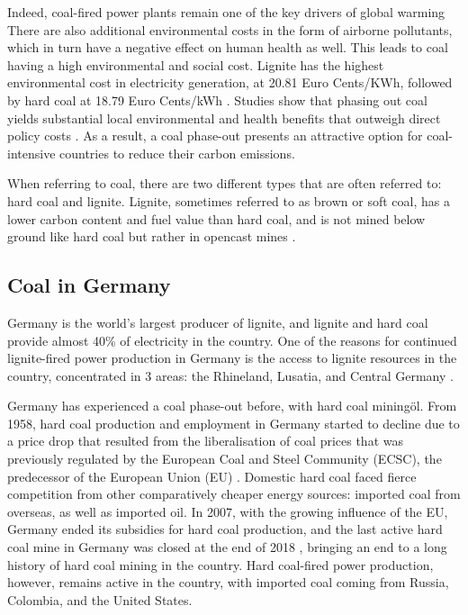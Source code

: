 \documentclass[12pt,onecolumn,twoside]{layout}
\begin{document}
Indeed, coal-fired power plants remain one of the key drivers of global warming \citep{Edwards2019,Zhao2019} There are also  additional environmental costs in the form of airborne pollutants, which in turn have a negative effect on human health as well. This leads to coal having a high environmental and social cost. Lignite has the highest environmental cost in electricity generation, at 20.81 Euro Cents/KWh, followed by hard coal at 18.79 Euro Cents/kWh \citep{Oei2020}. Studies show that phasing out coal yields substantial local environmental and health benefits that outweigh direct policy costs \citep{Rauner2020}. As a result, a coal phase-out presents an attractive option for coal-intensive countries to reduce their carbon emissions.

When referring to coal, there are two different types that are often referred to: hard coal and lignite. Lignite, sometimes referred to as brown or soft coal, has a lower carbon content and fuel value than hard coal, and is not mined below ground like hard coal but rather in opencast mines \citep{Appunn2019}.

\subsection*{Coal in Germany}
Germany is the world's largest producer of lignite, and lignite and hard coal provide almost 40\% of electricity in the country. One of the reasons for continued lignite-fired power production in Germany is the access to lignite resources in the country, concentrated in 3 areas: the Rhineland, Lusatia, and Central Germany \citep{AgoraEnergiewende2019}.

Germany has experienced a coal phase-out before, with hard coal miningöl. From 1958, hard coal production and employment in Germany started to decline due to a price drop that resulted from the liberalisation of coal prices that was previously regulated by the European Coal and Steel Community (ECSC), the predecessor of the European Union (EU) \citep{Oei2019}. Domestic hard coal faced fierce competition from other comparatively cheaper energy sources: imported coal from overseas, as well as imported oil.  In 2007, with the growing influence of the EU, Germany ended its subsidies for hard coal production, and the last active hard coal mine in Germany was closed at the end of 2018 \citep{Appunn2018}, bringing an end to a long history of hard coal mining in the country. Hard coal-fired power production, however, remains active in the country, with imported coal coming from Russia, Colombia, and the United States. 
\end{document}
